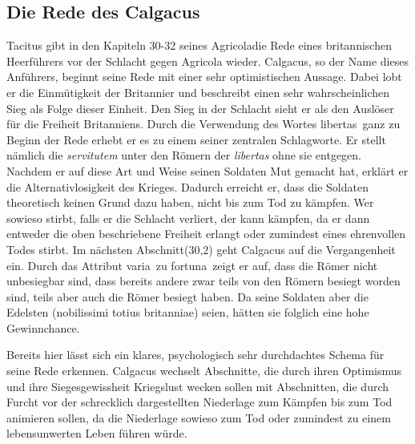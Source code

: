 \documentclass[12pt]{article}
\begin{document}
	\subsection{Die Rede des Calgacus}
	\label{calgacus}
	Tacitus gibt in den Kapiteln 30-32 seines \glqq Agricola\grqq die Rede eines britannischen Heerführers vor der Schlacht gegen Agricola wieder. Calgacus, so der Name dieses Anführers, beginnt seine Rede mit einer sehr optimistischen Aussage. Dabei lobt er die Einmütigkeit der Britannier und beschreibt einen sehr wahrscheinlichen Sieg als Folge dieser Einheit. Den Sieg in der Schlacht sieht er als den Auslöser für die Freiheit Britanniens. Durch die Verwendung des Wortes \glqq libertas\grqq\ ganz zu Beginn der Rede erhebt er es zu einem seiner zentralen Schlagworte. Er stellt nämlich die \textit{servitutem} unter den Römern der \textit{libertas} ohne sie entgegen. Nachdem er auf diese Art und Weise seinen Soldaten Mut gemacht hat, erklärt er die Alternativlosigkeit des Krieges. Dadurch erreicht er, dass die Soldaten theoretisch keinen Grund dazu haben, nicht bis zum Tod zu kämpfen. Wer sowieso stirbt, falls er die Schlacht verliert, der kann kämpfen, da er dann entweder die oben beschriebene Freiheit erlangt oder zumindest eines ehrenvollen Todes stirbt.
	Im nächsten Abschnitt(30,2) geht Calgacus auf die Vergangenheit ein. Durch das Attribut \glqq varia\grqq\ zu \glqq fortuna\grqq\ zeigt er auf, dass die Römer nicht unbesiegbar sind, dass bereits andere  zwar teils von den Römern besiegt worden sind, teils aber auch die Römer besiegt haben. Da seine Soldaten aber die Edelsten (\glqq nobilissimi totius britanniae\grqq) seien, hätten sie folglich eine hohe Gewinnchance.
	
	Bereits hier lässt sich ein klares, psychologisch sehr durchdachtes Schema für seine Rede erkennen. Calgacus wechselt Abschnitte, die durch ihren Optimismus und ihre Siegesgewissheit Kriegslust wecken sollen mit Abschnitten, die durch Furcht vor der schrecklich dargestellten Niederlage zum Kämpfen bis zum Tod animieren sollen, da die Niederlage sowieso zum Tod oder zumindest zu einem lebensunwerten Leben führen würde.
	
\end{document}
